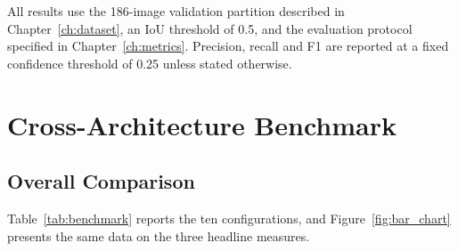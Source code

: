 \documentclass[MScCS]{uccthesis}
\begin{document}
All results use the 186-image validation partition described in
Chapter~\ref{ch:dataset}, an IoU threshold of 0.5, and the evaluation protocol
specified in Chapter~\ref{ch:metrics}. Precision, recall and F1 are reported at
a fixed confidence threshold of 0.25 unless stated otherwise.

\section{Cross-Architecture Benchmark}
\label{sec:results_benchmark}

\subsection{Overall Comparison}

Table~\ref{tab:benchmark} reports the ten configurations, and
Figure~\ref{fig:bar_chart} presents the same data on the three headline
measures.
\end{document}
